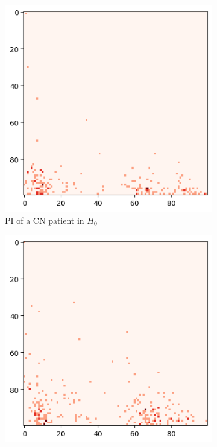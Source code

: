 \documentclass{article}
\begin{document}
\begin{figure}[htb]
  \centering
  \begin{subfigure}{0.32\textwidth}
    \includegraphics[width=\textwidth]{figures/representative_samples/Persistence_image_CN_h_0.png}
    \caption{PI of a CN patient in $H_0$}
  \end{subfigure}
  \begin{subfigure}{0.32\textwidth}
    \includegraphics[width=\textwidth]{figures/representative_samples/Persistence_image_MCI_h_0.png}

\end{subfigure}
\end{figure}
\end{document}
